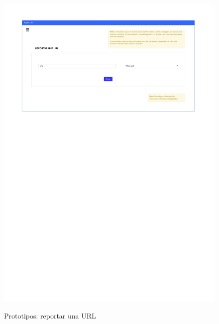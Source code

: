 \begin{figure}[h]
	\caption{Prototipos: reportar una URL}
	\centering
	\includegraphics[width=\textwidth]{../img/anexos/mockups/3-mockups-report_url}
	\label{mock:report_url}
\end{figure}


